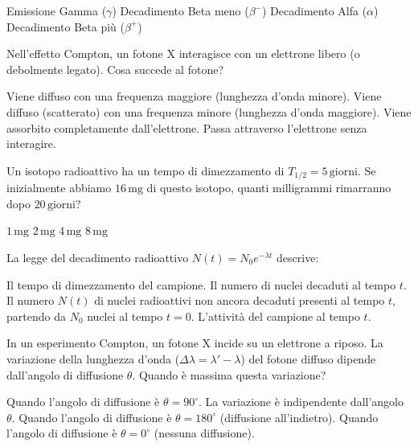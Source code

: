 \documentclass{exam}%
\begin{document}
\begin{questions}
\begin{multicols}{2}
\begin{choices}
\choice Emissione Gamma ($\gamma$)%
\choice Decadimento Beta meno ($\beta^-$)%
\choice Decadimento Alfa ($\alpha$)%
\choice Decadimento Beta più ($\beta^+$)%
\end{choices}%
\end{multicols}%
\question Nell'effetto Compton, un fotone X interagisce con un elettrone libero (o debolmente legato). Cosa succede al fotone?%
\vspace{0.2em}%
\begin{choices}%
\choice Viene diffuso con una frequenza maggiore (lunghezza d'onda minore).%
\choice Viene diffuso (scatterato) con una frequenza minore (lunghezza d'onda maggiore).%
\choice Viene assorbito completamente dall'elettrone.%
\choice Passa attraverso l'elettrone senza interagire.%
\end{choices}%
\question Un isotopo radioattivo ha un tempo di dimezzamento di $T_{1/2} = 5 \, \text{giorni}$. Se inizialmente abbiamo $16 \, \text{mg}$ di questo isotopo, quanti milligrammi rimarranno dopo $20 \, \text{giorni}$?%
\vspace{0.2em}%
\begin{multicols}{4}%
\begin{choices}%
\choice $1 \, \text{mg}$%
\choice $2 \, \text{mg}$%
\choice $4 \, \text{mg}$%
\choice $8 \, \text{mg}$%
\end{choices}%
\end{multicols}%
\question La legge del decadimento radioattivo $N(t) = N_0 e^{-\lambda t}$ descrive:%
\vspace{0.2em}%
\begin{choices}%
\choice Il tempo di dimezzamento del campione.%
\choice Il numero di nuclei decaduti al tempo $t$.%
\choice Il numero $N(t)$ di nuclei radioattivi non ancora decaduti presenti al tempo $t$, partendo da $N_0$ nuclei al tempo $t=0$.%
\choice L'attività del campione al tempo $t$.%
\end{choices}%
\question In un esperimento Compton, un fotone X incide su un elettrone a riposo. La variazione della lunghezza d'onda ($\Delta \lambda = \lambda' - \lambda$) del fotone diffuso dipende dall'angolo di diffusione $\theta$. Quando è massima questa variazione?%
\vspace{0.2em}%
\begin{choices}%
\choice Quando l'angolo di diffusione è $\theta = 90^\circ$.%
\choice La variazione è indipendente dall'angolo $\theta$.%
\choice Quando l'angolo di diffusione è $\theta = 180^\circ$ (diffusione all'indietro).%
\choice Quando l'angolo di diffusione è $\theta = 0^\circ$ (nessuna diffusione).%

\end{choices}
\end{questions}
\end{document}
